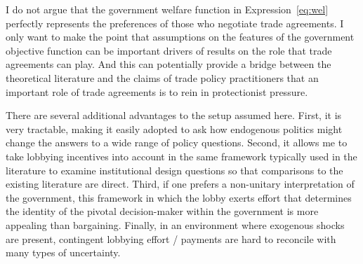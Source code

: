 \documentclass[12pt]{article}
\newcommand{\ga}{\gamma}
\begin{document}
I do not argue that the government welfare function in Expression~\ref{eq:wel} perfectly represents the preferences of those who negotiate trade agreements. I only want to make the point that assumptions on the features of the government objective function can be important drivers of results on the role that trade agreements can play. And this can potentially provide a bridge between the theoretical literature and the claims of trade policy practitioners that an important role of trade agreements is to rein in protectionist pressure.

There are several additional advantages to the setup assumed here. First, it is very tractable, making it easily adopted to ask how endogenous politics might change the answers to a wide range of policy questions. Second, it allows me to take lobbying incentives into account in the same framework typically used in the literature to examine institutional design questions so that comparisons to the existing literature are direct. Third, if one prefers a non-unitary interpretation of the government, this framework in which the lobby exerts effort that determines the identity of the pivotal decision-maker within the government is more appealing than bargaining. Finally, in an environment where exogenous shocks are present, contingent lobbying effort / payments are hard to reconcile with many types of uncertainty. 

\end{document}
